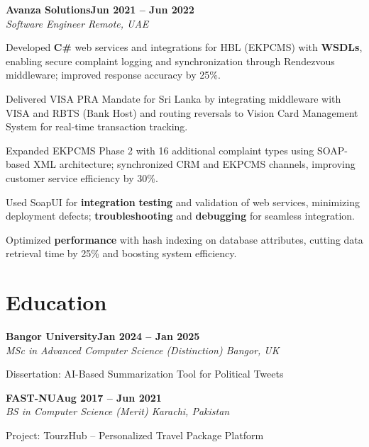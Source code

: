 \documentclass[letterpaper,10pt]{article}
\newcommand{\headingBf}[2]{
  \hspace{10pt}\textbf{#1}\hfill\textbf{#2}\\
}
\newcommand{\headingIt}[2]{
  \hspace{10pt}\textit{#1}\hfill\textit{#2}\\
}
\newenvironment{resume_list}{
  \vspace{-7pt}
  \begin{itemize}[itemsep=-2px, parsep=1pt, leftmargin=30pt]
}{
  \end{itemize}
}
\begin{document}
\headingBf{Avanza Solutions}{Jun 2021 -- Jun 2022}
\headingIt{Software Engineer \hfill Remote, UAE}{}
\begin{resume_list}
    \item Developed \textbf{C\#} web services and integrations for HBL (EKPCMS) with \textbf{WSDLs}, enabling secure complaint logging and synchronization through Rendezvous middleware; improved response accuracy by 25\%.
    \item Delivered VISA PRA Mandate for Sri Lanka by integrating middleware with VISA and RBTS (Bank Host) and routing reversals to Vision Card Management System for real-time transaction tracking.
    \item Expanded EKPCMS Phase 2 with 16 additional complaint types using SOAP-based XML architecture; synchronized CRM and EKPCMS channels, improving customer service efficiency by 30\%.
    \item Used SoapUI for \textbf{integration} \textbf{testing} and validation of web services, minimizing deployment defects; \textbf{troubleshooting} and \textbf{debugging} for seamless integration.
    \item Optimized \textbf{performance} with hash indexing on database attributes, cutting data retrieval time by 25\% and boosting system efficiency.
\end{resume_list}

\section{Education}

\headingBf{Bangor University}{Jan 2024 -- Jan 2025}
\headingIt{MSc in Advanced Computer Science (Distinction) \hfill Bangor, UK}{}
\begin{resume_list}
    \item Dissertation: AI-Based Summarization Tool for Political Tweets
\end{resume_list}

\headingBf{FAST-NU}{Aug 2017 -- Jun 2021}
\headingIt{BS in Computer Science (Merit) \hfill Karachi, Pakistan}{}
\begin{resume_list}
    \item Project: TourzHub -- Personalized Travel Package Platform
\end{resume_list}

\end{document}
